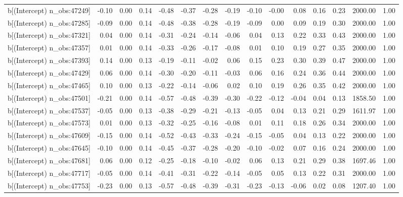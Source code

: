 \begin{table}[ht]
\begin{tabular}{rrrrrrrrrrrrrrr}
  b[(Intercept) n\_obs:47249] & -0.10 & 0.00 & 0.14 & -0.48 & -0.37 & -0.28 & -0.19 & -0.10 & -0.00 & 0.08 & 0.16 & 0.23 & 2000.00 & 1.00 \\ 
  b[(Intercept) n\_obs:47285] & -0.09 & 0.00 & 0.14 & -0.48 & -0.38 & -0.28 & -0.19 & -0.09 & 0.00 & 0.09 & 0.19 & 0.30 & 2000.00 & 1.00 \\ 
  b[(Intercept) n\_obs:47321] & 0.04 & 0.00 & 0.14 & -0.31 & -0.24 & -0.14 & -0.06 & 0.04 & 0.13 & 0.22 & 0.33 & 0.43 & 2000.00 & 1.00 \\ 
  b[(Intercept) n\_obs:47357] & 0.01 & 0.00 & 0.14 & -0.33 & -0.26 & -0.17 & -0.08 & 0.01 & 0.10 & 0.19 & 0.27 & 0.35 & 2000.00 & 1.00 \\ 
  b[(Intercept) n\_obs:47393] & 0.14 & 0.00 & 0.13 & -0.19 & -0.11 & -0.02 & 0.06 & 0.15 & 0.23 & 0.30 & 0.39 & 0.47 & 2000.00 & 1.00 \\ 
  b[(Intercept) n\_obs:47429] & 0.06 & 0.00 & 0.14 & -0.30 & -0.20 & -0.11 & -0.03 & 0.06 & 0.16 & 0.24 & 0.36 & 0.44 & 2000.00 & 1.00 \\ 
  b[(Intercept) n\_obs:47465] & 0.10 & 0.00 & 0.13 & -0.22 & -0.14 & -0.06 & 0.02 & 0.10 & 0.19 & 0.26 & 0.35 & 0.42 & 2000.00 & 1.00 \\ 
  b[(Intercept) n\_obs:47501] & -0.21 & 0.00 & 0.14 & -0.57 & -0.48 & -0.39 & -0.30 & -0.22 & -0.12 & -0.04 & 0.04 & 0.13 & 1858.50 & 1.00 \\ 
  b[(Intercept) n\_obs:47537] & -0.05 & 0.00 & 0.13 & -0.38 & -0.29 & -0.21 & -0.13 & -0.05 & 0.04 & 0.13 & 0.21 & 0.29 & 1611.97 & 1.00 \\ 
  b[(Intercept) n\_obs:47573] & 0.01 & 0.00 & 0.13 & -0.32 & -0.25 & -0.16 & -0.08 & 0.01 & 0.11 & 0.18 & 0.26 & 0.34 & 2000.00 & 1.00 \\ 
  b[(Intercept) n\_obs:47609] & -0.15 & 0.00 & 0.14 & -0.52 & -0.43 & -0.33 & -0.24 & -0.15 & -0.05 & 0.04 & 0.13 & 0.22 & 2000.00 & 1.00 \\ 
  b[(Intercept) n\_obs:47645] & -0.10 & 0.00 & 0.14 & -0.45 & -0.37 & -0.28 & -0.20 & -0.10 & -0.02 & 0.07 & 0.16 & 0.24 & 2000.00 & 1.00 \\ 
  b[(Intercept) n\_obs:47681] & 0.06 & 0.00 & 0.12 & -0.25 & -0.18 & -0.10 & -0.02 & 0.06 & 0.13 & 0.21 & 0.29 & 0.38 & 1697.46 & 1.00 \\ 
  b[(Intercept) n\_obs:47717] & -0.05 & 0.00 & 0.14 & -0.41 & -0.31 & -0.22 & -0.14 & -0.05 & 0.05 & 0.13 & 0.22 & 0.31 & 2000.00 & 1.00 \\ 
  b[(Intercept) n\_obs:47753] & -0.23 & 0.00 & 0.13 & -0.57 & -0.48 & -0.39 & -0.31 & -0.23 & -0.13 & -0.06 & 0.02 & 0.08 & 1207.40 & 1.00 \\ 

\end{tabular}
\end{table}
